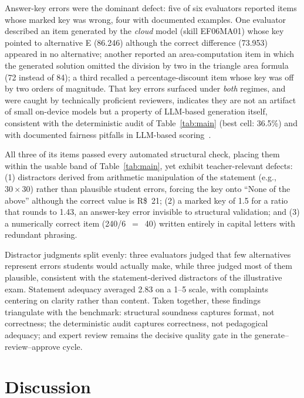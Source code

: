 \documentclass[fleqn,10pt]{JLA_article}
\begin{document}
Answer-key errors were the dominant defect: five of six evaluators reported items whose marked key was wrong, four with documented examples. One evaluator described an item generated by the \emph{cloud} model (skill EF06MA01) whose key pointed to alternative E (86{.}246) although the correct difference (73{.}953) appeared in no alternative; another reported an area-computation item in which the generated solution omitted the division by two in the triangle area formula (72 instead of 84); a third recalled a percentage-discount item whose key was off by two orders of magnitude. That key errors surfaced under \emph{both} regimes, and were caught by technically proficient reviewers, indicates they are not an artifact of small on-device models but a property of LLM-based generation itself, consistent with the deterministic audit of Table~\ref{tab:main} (best cell: 36.5\%) and with documented fairness pitfalls in LLM-based scoring~\autocite{rodrigues2025gpt4fair}.

All three of its items passed every automated structural check, placing them within the usable band of Table~\ref{tab:main}, yet exhibit teacher-relevant defects: (1) distractors derived from arithmetic manipulation of the statement (e.g., $30 \times 30$) rather than plausible student errors, forcing the key onto ``None of the above'' although the correct value is R\$~21; (2) a marked key of 1.5 for a ratio that rounds to 1.43, an answer-key error invisible to structural validation; and (3) a numerically correct item (240/6~$=$~40) written entirely in capital letters with redundant phrasing.

Distractor judgments split evenly: three evaluators judged that few alternatives represent errors students would actually make, while three judged most of them plausible, consistent with the statement-derived distractors of the illustrative exam. Statement adequacy averaged 2.83 on a 1--5 scale, with complaints centering on clarity rather than content. Taken together, these findings triangulate with the benchmark: structural soundness captures format, not correctness; the deterministic audit captures correctness, not pedagogical adequacy; and expert review remains the decisive quality gate in the generate--review--approve cycle.
\section{Discussion}
\end{document}
